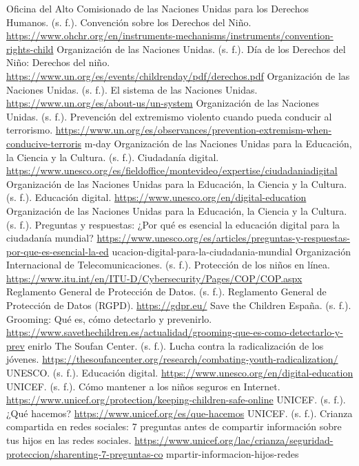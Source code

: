 \begin{referencelist}
   Oficina del Alto Comisionado de las Naciones Unidas para los Derechos Humanos. (s. f.). Convención sobre los Derechos del Niño. \url{https://www.ohchr.org/en/instruments-mechanisms/instruments/convention-rights-child}
   Organización de las Naciones Unidas. (s. f.). Día de los Derechos del Niño: Derechos del niño. \url{https://www.un.org/es/events/childrenday/pdf/derechos.pdf}
   Organización de las Naciones Unidas. (s. f.). El sistema de las Naciones Unidas. \url{https://www.un.org/es/about-us/un-system}
   Organización de las Naciones Unidas. (s. f.). Prevención del extremismo violento cuando pueda conducir al terrorismo. \url{https://www.un.org/es/observances/prevention-extremism-when-conducive-terroris} m-day
   Organización de las Naciones Unidas para la Educación, la Ciencia y la Cultura. (s. f.). Ciudadanía digital. \url{https://www.unesco.org/es/fieldoffice/montevideo/expertise/ciudadaniadigital}
   Organización de las Naciones Unidas para la Educación, la Ciencia y la Cultura. (s. f.). Educación digital. \url{https://www.unesco.org/en/digital-education}
   Organización de las Naciones Unidas para la Educación, la Ciencia y la Cultura. (s. f.). Preguntas y respuestas: ¿Por qué es esencial la educación digital para la ciudadanía mundial?
   \url{https://www.unesco.org/es/articles/preguntas-y-respuestas-por-que-es-esencial-la-ed} ucacion-digital-para-la-ciudadania-mundial Organización Internacional de Telecomunicaciones. (s. f.). Protección de los niños en línea. \url{https://www.itu.int/en/ITU-D/Cybersecurity/Pages/COP/COP.aspx}
   Reglamento General de Protección de Datos. (s. f.). Reglamento General de Protección de Datos (RGPD). \url{https://gdpr.eu/}
   Save the Children España. (s. f.). Grooming: Qué es, cómo detectarlo y prevenirlo. \url{https://www.savethechildren.es/actualidad/grooming-que-es-como-detectarlo-y-prev} enirlo
   The Soufan Center. (s. f.). Lucha contra la radicalización de los jóvenes. \url{https://thesoufancenter.org/research/combating-youth-radicalization/}
   UNESCO. (s. f.). Educación digital. \url{https://www.unesco.org/en/digital-education}
   UNICEF. (s. f.). Cómo mantener a los niños seguros en Internet. \url{https://www.unicef.org/protection/keeping-children-safe-online}
   UNICEF. (s. f.). ¿Qué hacemos? \url{https://www.unicef.org/es/que-hacemos}
   UNICEF. (s. f.). Crianza compartida en redes sociales: 7 preguntas antes de compartir información sobre tus hijos en las redes sociales. \url{https://www.unicef.org/lac/crianza/seguridad-proteccion/sharenting-7-preguntas-co} mpartir-informacion-hijos-redes

\end{referencelist}
